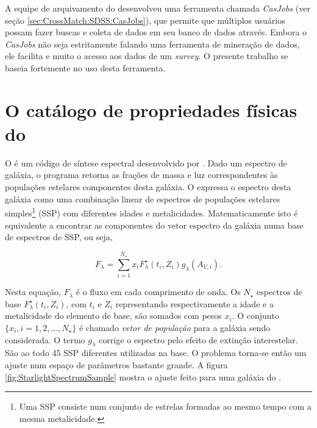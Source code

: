 A equipe de arquivamento do \SDSS desenvolveu uma ferramenta chamada {\em
CasJobs} (ver seção \ref{sec:CrossMatch:SDSS:CasJobs}), que permite que
múltiplos usuários possam fazer buscas e coleta de dados em seu banco de dados
através. Embora o {\em CasJobs} não seja estritamente falando uma ferramenta de
mineração de dados, ele facilita e muito o acesso aos dados de um {\em survey}.
O presente trabalho se baseia fortemente no uso desta ferramenta.



\section{O catálogo de propriedades físicas do \STARLIGHT}
\label{sec:Intro:Starlight}

O \starlight é um código de síntese espectral desenvolvido por
\citet{CidFernandes2005}. Dado um espectro de galáxia, o programa retorna as
frações de massa e luz correspondentes às populações estelares componentes desta
galáxia. O \starlight expressa o espectro desta galáxia como uma combinação
linear de espectros de populações estelares simples\footnote{Uma SSP consiste
num conjunto de estrelas formadas ao mesmo tempo com a mesma metalicidade.}
(SSP) com diferentes idades e metalicidades. Matematicamente isto é equivalente
a encontrar as componentes do vetor espectro da galáxia numa base de espectros
de SSP, ou seja,

\begin{equation*}
F_\lambda = \sum_{i=1}^{N_\star} x_i F^\star_\lambda(t_i,Z_i)
g_\lambda(A_{V,i}).
\end{equation*}

Nesta equação, $F_\lambda$ é o fluxo em cada comprimento de onda. Os $N_\star$
espectros de base $F^\star_\lambda(t_i, Z_i)$, com $t_i$ e $Z_i$ representando
respectivamente a idade e a metalicidade do elemento de base, são somados com
pesos $x_i$. O conjunto $\{x_i, i=1,2,\ldots,N_\star\}$ é chamado {\em vetor de
população} para a galáxia sendo considerada. O termo $g_\lambda$ corrige o
espectro pelo efeito de extinção interestelar. São ao todo 45 SSP diferentes
utilizadas na base. O problema torna-se então um ajuste num espaço de parâmetros
bastante grande. A figura \ref{fig:StarlightSpectrumSample} mostra o ajuste
feito para uma galáxia do \SDSS.


